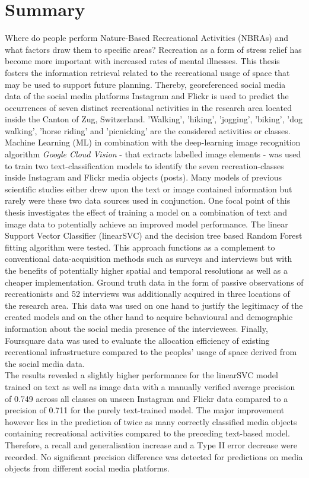 \chapter*{Summary}
Where do people perform Nature-Based Recreational Activities (NBRAs) and what factors draw them to specific areas? Recreation as a form of stress relief has become more important with increased rates of mental illnesses. This thesis fosters the information retrieval related to the recreational usage of space that may be used to support future planning. Thereby, georeferenced social media data of the social media platforms Instagram and Flickr is used to predict the occurrences of seven distinct recreational activities in the research area located inside the Canton of Zug, Switzerland. 'Walking', 'hiking', 'jogging', 'biking', 'dog walking', 'horse riding' and 'picnicking' are the considered activities or classes. \\
Machine Learning (ML) in combination with the deep-learning image recognition algorithm \textit{Google Cloud Vision} - that extracts labelled image elements - was used to train two text-classification models to identify the seven recreation-classes inside Instagram and Flickr media objects (posts). Many models of previous scientific studies either drew upon the text or image contained information but rarely were these two data sources used in conjunction. One focal point of this thesis investigates the effect of training a model on a combination of text and image data to potentially achieve an improved model performance. The linear Support Vector Classifier (linearSVC) and the decision tree based Random Forest fitting algorithm were tested. This approach functions as a complement to conventional data-acquisition methods such as surveys and interviews but with the benefits of potentially higher spatial and temporal resolutions as well as a cheaper implementation. Ground truth data in the form of passive observations of recreationists and 52 interviews was additionally acquired in three locations of the research area. This data was used on one hand to justify the legitimacy of the created models and on the other hand to acquire behavioural and demographic information about the social media presence of the interviewees. Finally, Foursquare data was used to evaluate the allocation efficiency of existing recreational infrastructure compared to the peoples' usage of space derived from the social media data.\\
The results revealed a slightly higher performance for the linearSVC model trained on text as well as image data with a manually verified average precision of 0.749 across all classes on unseen Instagram and Flickr data compared to a precision of 0.711 for the purely text-trained model. The major improvement however lies in the prediction of twice as many correctly classified media objects containing recreational activities compared to the preceding text-based model. Therefore, a recall and generalisation increase and a Type II error decrease were recorded. No significant precision difference was detected for predictions on media objects from different social media platforms.
